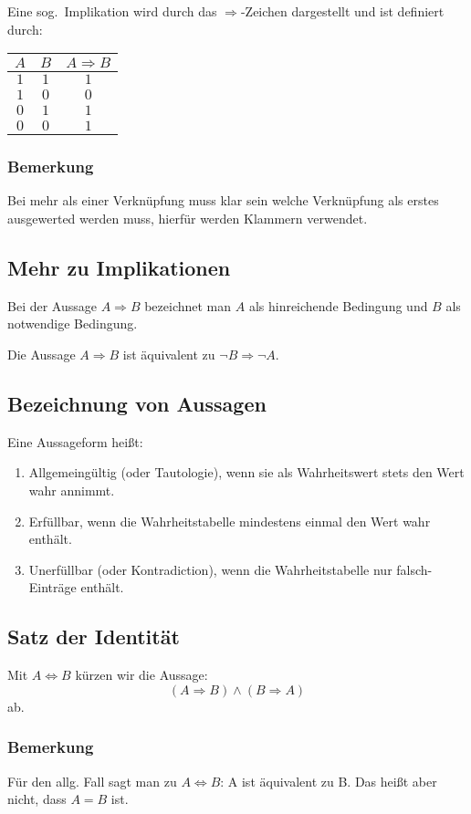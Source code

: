 Eine sog.\ Implikation wird durch das $\Rightarrow$-Zeichen dargestellt und
ist definiert durch:
\begin{center}
    \begin{tabular}{ccc}
        \toprule
        $A$ & $B$ & $A \Rightarrow B$ \\
        \midrule
        $1$ & $1$ & $1$ \\
        $1$ & $0$ & $0$ \\
        $0$ & $1$ & $1$ \\
        $0$ & $0$ & $1$ \\
        \bottomrule
    \end{tabular}
\end{center}

\subsubsection{Bemerkung}
Bei mehr als einer Verknüpfung muss klar sein welche Verknüpfung
als erstes ausgewerted werden muss, hierfür werden Klammern verwendet.

\subsection{Mehr zu Implikationen}
Bei der Aussage $A \Rightarrow B$ bezeichnet man $A$ als hinreichende
Bedingung und $B$ als notwendige Bedingung.

Die Aussage $A \Rightarrow B$ ist äquivalent zu $\lnot B \Rightarrow \lnot A$.

\subsection{Bezeichnung von Aussagen}
Eine Aussageform heißt:
\begin{enumerate}[label= (\alph*)]
    \item Allgemeingültig (oder Tautologie), wenn sie als Wahrheitswert stets
        den Wert wahr annimmt.
    \item Erfüllbar, wenn die Wahrheitstabelle mindestens einmal den Wert
        wahr enthält.
    \item Unerfüllbar (oder Kontradiction), wenn die Wahrheitstabelle nur
        falsch-Einträge enthält.
\end{enumerate}

\subsection{Satz der Identität}
Mit $A \Leftrightarrow B$ kürzen wir die Aussage:
\begin{equation*}
    (A \Rightarrow B) \land (B \Rightarrow A)
\end{equation*}
ab.

\subsubsection{Bemerkung}
Für den allg. Fall sagt man zu $A \Leftrightarrow B$: A ist äquivalent
zu B. Das heißt aber nicht, dass $A=B$ ist.
